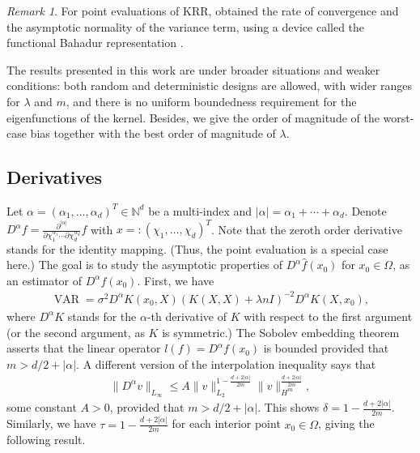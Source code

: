 \documentclass[12pt]{article}
\theoremstyle{plain}
\theoremstyle{remark}
\newtheorem{remark}{Remark}
\begin{document}
\begin{remark}
    For point evaluations of KRR, \cite{shang2013local,zhao2021statistical} obtained the rate of convergence and the asymptotic normality of the variance term, using a device called the functional Bahadur representation \citep{shang2010convergence}.
   
    The results presented in this work are under broader situations and weaker conditions: both random and deterministic designs are allowed, with wider ranges for $\lambda$ and $m$, and there is no uniform boundedness requirement for the eigenfunctions of the kernel. Besides, we give the order of magnitude of the worst-case bias together with the best order of magnitude of $\lambda$.
\end{remark}


\subsection{Derivatives}

Let $\alpha=(\alpha_1,\ldots,\alpha_d)^T\in\mathbb{N}^d$ be a multi-index and $|\alpha|=\alpha_1+\cdots+\alpha_d$. Denote $D^\alpha f=\frac{\partial^{|\alpha|}}{\partial \chi_1^{\alpha_1}\cdots\partial \chi_d^{\alpha_d}}f$ with $x=:(\chi_1,\ldots,\chi_d)^T$. Note that the zeroth order derivative stands for the identity mapping. (Thus, the point evaluation is a special case here.) The goal is to study the asymptotic properties of $D^\alpha \hat{f}(x_0)$ for $x_0\in\Omega$, as an estimator of $D^\alpha f(x_0)$. First, we have
\begin{eqnarray}\label{VARderivative}
    \operatorname{VAR}=\sigma^2 D^\alpha K(x_0,X)(K(X,X)+\lambda n I)^{-2}D^\alpha K(X,x_0),
\end{eqnarray}
where $D^\alpha K$ stands for the $\alpha$-th derivative of $K$ with respect to the first argument (or the second argument, as $K$ is symmetric.)
The Sobolev embedding theorem asserts that the linear operator $l(f)=D^\alpha f(x_0)$ is bounded provided that $m>d/2+|\alpha|$.
A different version of the interpolation inequality says that
\begin{eqnarray}\label{interpolationD}
    \|D^\alpha v\|_{L_\infty}\leq A\|v\|^{1-\frac{d+2|\alpha|}{2m}}_{L_2}\|v\|^{\frac{d+2|\alpha|}{2m}}_{H^m},
\end{eqnarray}
some constant $A>0$, provided that $m>d/2+|\alpha|$. This shows $\delta=1-\frac{d+2|\alpha|}{2m}$. Similarly, we have $\tau=1-\frac{d+2|\alpha|}{2m}$ for each interior point $x_0\in\Omega$, giving the following result.
\end{document}
